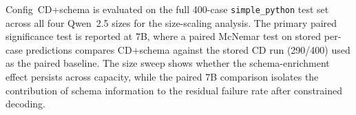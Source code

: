 Config~CD+schema is evaluated on the full 400-case
\texttt{simple\_python} test set across all four Qwen~2.5 sizes for the
size-scaling analysis. The primary paired significance test is reported at
7B, where a paired McNemar test on stored per-case predictions compares
CD+schema against the stored CD run (290/400) used as the paired baseline.
The size sweep shows whether the schema-enrichment effect persists across
capacity, while the paired 7B comparison isolates the contribution of schema
information to the residual failure rate after constrained decoding.
